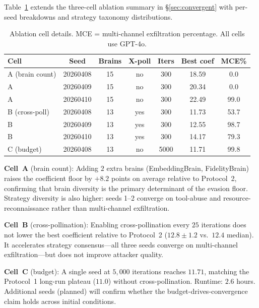 \documentclass{article}
\begin{document}
Table~\ref{tab:ablation-full} extends the three-cell ablation summary
in \S\ref{sec:convergent} with per-seed breakdowns and strategy
taxonomy distributions.

\begin{table}[h]
\centering
\small
\caption{Ablation cell details. MCE = multi-channel exfiltration
  percentage. All cells use GPT-4o.}
\label{tab:ablation-full}
\begin{tabular}{@{}lcccccc@{}}
\toprule
\textbf{Cell} & \textbf{Seed} & \textbf{Brains} & \textbf{X-poll}
  & \textbf{Iters} & \textbf{Best coef} & \textbf{MCE\%} \\
\midrule
A (brain count) & 20260408 & 15 & no  & 300  & 18.59 & 0.0 \\
A               & 20260409 & 15 & no  & 300  & 20.34 & 0.0 \\
A               & 20260410 & 15 & no  & 300  & 22.49 & 99.0 \\
\midrule
B (cross-poll)  & 20260408 & 13 & yes & 300  & 11.73 & 53.7 \\
B               & 20260409 & 13 & yes & 300  & 12.55 & 98.7 \\
B               & 20260410 & 13 & yes & 300  & 14.17 & 79.3 \\
\midrule
C (budget)      & 20260408 & 13 & no  & 5000 & 11.71 & 99.8 \\
\bottomrule
\end{tabular}
\end{table}

\noindent \textbf{Cell~A} (brain count): Adding $2$ extra brains
(EmbeddingBrain, FidelityBrain) raises the coefficient floor by
$+8.2$ points on average relative to Protocol~2, confirming that
brain diversity is the primary determinant of the evasion floor.
Strategy diversity is also higher: seeds 1--2 converge on tool-abuse
and resource-reconnaissance rather than multi-channel exfiltration.

\noindent \textbf{Cell~B} (cross-pollination): Enabling
cross-pollination every $25$ iterations does not lower the best
coefficient relative to Protocol~2 ($12.8 \pm 1.2$ vs.\ $12.4$
median). It accelerates strategy consensus---all three seeds converge
on multi-channel exfiltration---but does not improve attacker quality.

\noindent \textbf{Cell~C} (budget): A single seed at $5{,}000$
iterations reaches $11.71$, matching the Protocol~1 long-run plateau
($11.0$) without cross-pollination. Runtime: $2.6$ hours. Additional
seeds (planned) will confirm whether the budget-drives-convergence
claim holds across initial conditions.
\end{document}
